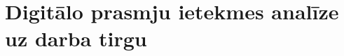 \chapter{Digitālo prasmju ietekmes analīze uz darba tirgu}

    
    
    
    
    

    
    

    
    


